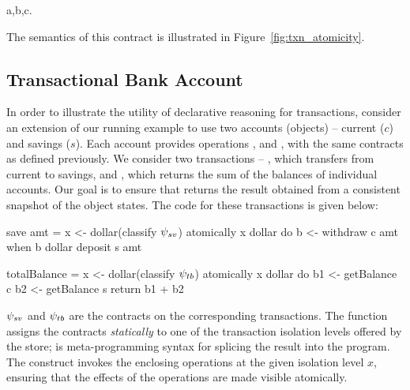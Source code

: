 \begin{cmathpar}
\forall a,b,c.~ ~\wedge~  ~\wedge~ 
\Rightarrow {}
\end{cmathpar}

\noindent The semantics of this contract is illustrated in
Figure~\ref{fig:txn_atomicity}.

\subsection{Transactional Bank Account}

In order to illustrate the utility of declarative reasoning for transactions,
consider an extension of our running example to use two accounts (objects) --
current ($c$) and savings ($s$). Each account provides operations
,  and , with the same contracts as
defined previously. We consider two transactions -- , which
transfers  from current to savings, and , which
returns the sum of the balances of individual accounts. Our goal is to ensure
that  returns the result obtained from a consistent snapshot
of the object states. The \name code for these transactions is given below:

\noindent \begin{minipage}[t]{0.53\columnwidth}
\begin{codehaskell}
save amt =
  x <- dollar(classify $\psi_{sv}$)
  atomically x dollar do
    b <- withdraw c amt
    when b dollar deposit s amt
\end{codehaskell}
\end{minipage}
\begin{minipage}[t]{0.47\columnwidth}
\begin{codehaskell}
totalBalance =
  x <- dollar(classify $\psi_{tb}$)
  atomically x dollar do
    b1 <- getBalance c
    b2 <- getBalance s
    return b1 + b2
\end{codehaskell}
\end{minipage}

$\psi_{sv}$ and $\psi_{tb}$ are the contracts on the corresponding
transactions. The function  assigns the contracts
\emph{statically} to one of the transaction isolation levels offered by the
store; \cf{\$()} is meta-programming syntax for splicing the result into the
program. The  construct invokes the enclosing operations at the
given isolation level $x$, ensuring that the effects of the operations are made
visible atomically.

